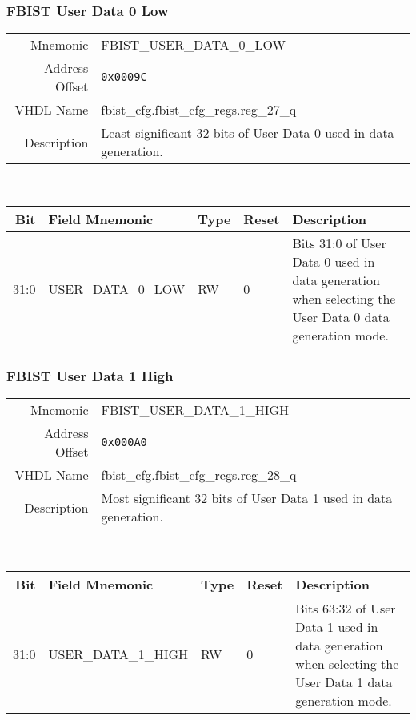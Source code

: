 \subsubsection{FBIST User Data 0 Low}
\begin{tabular}{ r | p{350px} }
  Mnemonic       & FBIST\_USER\_DATA\_0\_LOW              \\
  Address Offset & \texttt{0x0009C}                        \\
  VHDL Name      &  fbist\_cfg.fbist\_cfg\_regs.reg\_27\_q \\ \hline

  Description &
  Least significant 32 bits of User Data 0 used in data generation. \\
\end{tabular}
\\
\begin{tabularx}{\textwidth}{r|l|l|l|X}
  \hline
  Bit   & Field Mnemonic     & Type & Reset & Description \\ \hline

  31:0  & USER\_DATA\_0\_LOW & RW   & 0     &

  Bits 31:0 of User Data 0 used in data generation when selecting the
  User Data 0 data generation mode. \\
\end{tabularx}

\subsubsection{FBIST User Data 1 High}
\begin{tabular}{ r | p{350px} }
  Mnemonic       & FBIST\_USER\_DATA\_1\_HIGH              \\
  Address Offset & \texttt{0x000A0}                        \\
  VHDL Name      &  fbist\_cfg.fbist\_cfg\_regs.reg\_28\_q \\ \hline

  Description &
  Most significant 32 bits of User Data 1 used in data generation. \\
\end{tabular}
\\
\begin{tabularx}{\textwidth}{r|l|l|l|X}
  \hline
  Bit   & Field Mnemonic      & Type & Reset & Description \\ \hline

  31:0  & USER\_DATA\_1\_HIGH & RW   & 0     &

  Bits 63:32 of User Data 1 used in data generation when selecting the
  User Data 1 data generation mode. \\
\end{tabularx}

